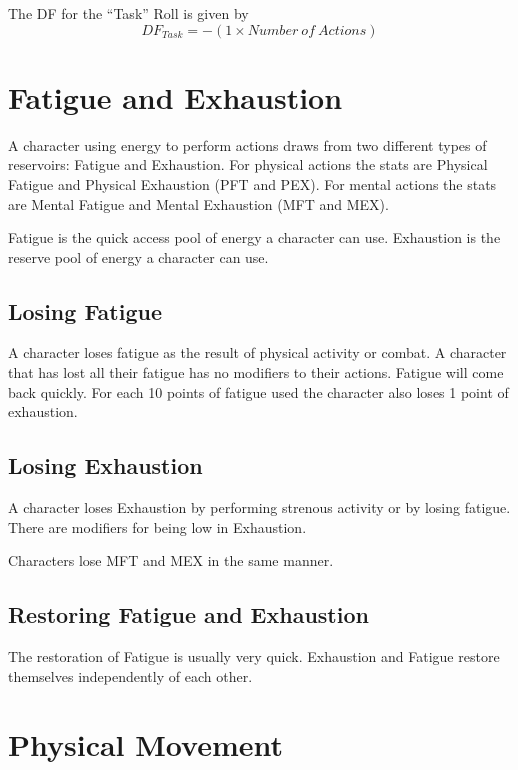 The DF for the ``Task'' Roll is given by \[ DF_{Task} =  - ( 1
\times {Number\ of\ Actions }) \]  

\section{Fatigue and Exhaustion}

A character using energy to perform actions draws from two different 
types of reservoirs: Fatigue and Exhaustion. For physical actions the 
stats are Physical Fatigue and Physical Exhaustion (PFT and PEX). For mental
actions the stats are Mental Fatigue and Mental Exhaustion (MFT and MEX).

Fatigue is the quick access pool of energy a character can use.
Exhaustion is the reserve pool of energy a character can use. 

\subsection{Losing Fatigue}

A character loses fatigue as the result of physical activity or combat. 
A character that has lost all their fatigue has no modifiers to their actions.
Fatigue will come back quickly. For each 10 points of fatigue used the character 
also loses 1 point of exhaustion.

\subsection{Losing Exhaustion}
A character loses Exhaustion by performing strenous activity or by losing 
fatigue. There are modifiers for being low in Exhaustion.



Characters lose MFT and MEX in the same manner.



\subsection{Restoring Fatigue and Exhaustion}

The restoration of Fatigue is usually very quick. Exhaustion and Fatigue
restore themselves independently of each other.



\section{Physical Movement}

